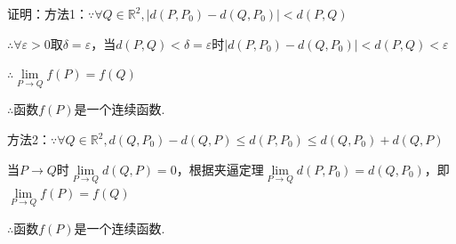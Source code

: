 \documentclass[12pt,UTF8]{ctexart}
\begin{document}
\begin{enumerate}
证明：方法1：$\because\forall Q\in\mathbb R^2,|d(P,P_0)-d(Q,P_0)|<d(P,Q)$

$\therefore\forall\varepsilon>0$取$\delta=\varepsilon$，当$d(P,Q)<\delta=\varepsilon$时$|d(P,P_0)-d(Q,P_0)|<d(P,Q)<\varepsilon$

$\therefore\lim\limits_{P\rightarrow Q}f(P)=f(Q)$

$\therefore$函数$f(P)$是一个连续函数.

方法2：$\because\forall Q\in\mathbb R^2,d(Q,P_0)-d(Q,P)\leq d(P,P_0)\leq d(Q,P_0)+d(Q,P)$

当$P\rightarrow Q$时$\lim\limits_{P\rightarrow Q}d(Q,P)=0$，根据夹逼定理$\lim\limits_{P\rightarrow Q}d(P,P_0)=d(Q,P_0)$，即$\lim\limits_{P\rightarrow Q}f(P)=f(Q)$

$\therefore$函数$f(P)$是一个连续函数.
\end{enumerate}
\end{document}
